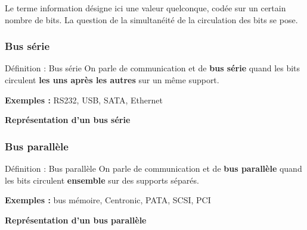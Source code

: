 \documentclass[a4paper,12pt]{article}
\begin{document}
Le terme information désigne ici une valeur quelconque, codée sur un certain nombre de bits. La question de la simultanéité de la circulation des bits se pose.

\subsubsection{Bus série}

\begin{defbox}{Définition : Bus série}
On parle de communication et de \textbf{bus série} quand les bits circulent \textbf{les uns après les autres} sur un même support.

\vspace{0.3cm}
\textbf{Exemples :} RS232, USB, SATA, Ethernet
\end{defbox}

\begin{center}
\textbf{Représentation d'un bus série}

\vspace{0.5cm}
\end{center}

\subsubsection{Bus parallèle}

\begin{defbox}{Définition : Bus parallèle}
On parle de communication et de \textbf{bus parallèle} quand les bits circulent \textbf{ensemble} sur des supports séparés.

\vspace{0.3cm}
\textbf{Exemples :} bus mémoire, Centronic, PATA, SCSI, PCI
\end{defbox}

\begin{center}
\textbf{Représentation d'un bus parallèle}

\vspace{0.5cm}
\end{center}
\end{document}
